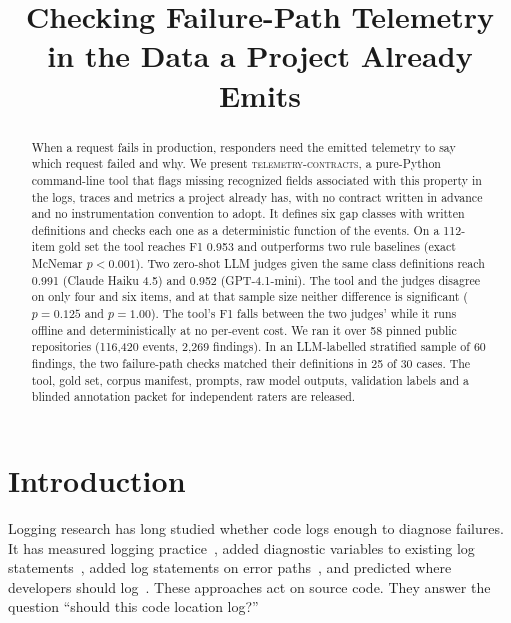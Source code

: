 \documentclass[conference]{IEEEtran}
\newcommand{\tool}{\textsc{telemetry-contracts}\xspace}
\begin{document}
\title{Checking Failure-Path Telemetry in the Data a Project Already Emits}

\author{
}

\maketitle

\begin{abstract}
When a request fails in production, responders need the emitted telemetry to say which request failed and why. We present \tool, a pure-Python command-line tool that flags missing recognized fields associated with this property in the logs, traces and metrics a project already has, with no contract written in advance and no instrumentation convention to adopt. It defines six gap classes with written definitions and checks each one as a deterministic function of the events. On a 112-item gold set the tool reaches F1 0.953 and outperforms two rule baselines (exact McNemar $p < 0.001$). Two zero-shot LLM judges given the same class definitions reach 0.991 (Claude Haiku 4.5) and 0.952 (GPT-4.1-mini). The tool and the judges disagree on only four and six items, and at that sample size neither difference is significant ($p = 0.125$ and $p = 1.00$). The tool's F1 falls between the two judges' while it runs offline and deterministically at no per-event cost. We ran it over 58 pinned public repositories (116,420 events, 2,269 findings). In an LLM-labelled stratified sample of 60 findings, the two failure-path checks matched their definitions in 25 of 30 cases. The tool, gold set, corpus manifest, prompts, raw model outputs, validation labels and a blinded annotation packet for independent raters are released.
\end{abstract}

\section{Introduction}

Logging research has long studied whether code logs enough to diagnose failures. It has measured logging practice~\cite{yuan2012characterizing,chen2017replication,zeng2019mobile}, added diagnostic variables to existing log statements~\cite{yuan2011logenhancer}, added log statements on error paths~\cite{yuan2012conservative}, and predicted where developers should log~\cite{fu2014where,zhu2015learning,li2020where}. These approaches act on source code. They answer the question ``should this code location log?''
\end{document}
